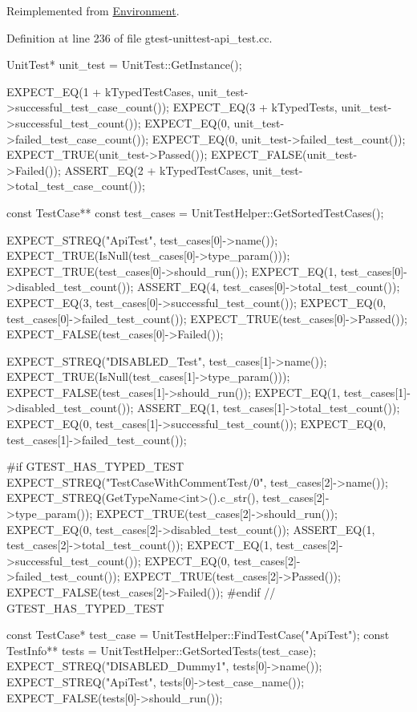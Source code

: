 \-Reimplemented from \hyperlink{classtesting_1_1Environment_a870a092058305911f3d42df45dd657e5}{\-Environment}.



\-Definition at line 236 of file gtest-\/unittest-\/api\-\_\-test.\-cc.


\begin{DoxyCode}
                          {
    UnitTest* unit_test = UnitTest::GetInstance();

    EXPECT_EQ(1 + kTypedTestCases, unit_test->successful_test_case_count());
    EXPECT_EQ(3 + kTypedTests, unit_test->successful_test_count());
    EXPECT_EQ(0, unit_test->failed_test_case_count());
    EXPECT_EQ(0, unit_test->failed_test_count());
    EXPECT_TRUE(unit_test->Passed());
    EXPECT_FALSE(unit_test->Failed());
    ASSERT_EQ(2 + kTypedTestCases, unit_test->total_test_case_count());

    const TestCase** const test_cases = UnitTestHelper::GetSortedTestCases();

    EXPECT_STREQ("ApiTest", test_cases[0]->name());
    EXPECT_TRUE(IsNull(test_cases[0]->type_param()));
    EXPECT_TRUE(test_cases[0]->should_run());
    EXPECT_EQ(1, test_cases[0]->disabled_test_count());
    ASSERT_EQ(4, test_cases[0]->total_test_count());
    EXPECT_EQ(3, test_cases[0]->successful_test_count());
    EXPECT_EQ(0, test_cases[0]->failed_test_count());
    EXPECT_TRUE(test_cases[0]->Passed());
    EXPECT_FALSE(test_cases[0]->Failed());

    EXPECT_STREQ("DISABLED_Test", test_cases[1]->name());
    EXPECT_TRUE(IsNull(test_cases[1]->type_param()));
    EXPECT_FALSE(test_cases[1]->should_run());
    EXPECT_EQ(1, test_cases[1]->disabled_test_count());
    ASSERT_EQ(1, test_cases[1]->total_test_count());
    EXPECT_EQ(0, test_cases[1]->successful_test_count());
    EXPECT_EQ(0, test_cases[1]->failed_test_count());

#if GTEST_HAS_TYPED_TEST
    EXPECT_STREQ("TestCaseWithCommentTest/0", test_cases[2]->name());
    EXPECT_STREQ(GetTypeName<int>().c_str(), test_cases[2]->type_param());
    EXPECT_TRUE(test_cases[2]->should_run());
    EXPECT_EQ(0, test_cases[2]->disabled_test_count());
    ASSERT_EQ(1, test_cases[2]->total_test_count());
    EXPECT_EQ(1, test_cases[2]->successful_test_count());
    EXPECT_EQ(0, test_cases[2]->failed_test_count());
    EXPECT_TRUE(test_cases[2]->Passed());
    EXPECT_FALSE(test_cases[2]->Failed());
#endif  // GTEST_HAS_TYPED_TEST

    const TestCase* test_case = UnitTestHelper::FindTestCase("ApiTest");
    const TestInfo** tests = UnitTestHelper::GetSortedTests(test_case);
    EXPECT_STREQ("DISABLED_Dummy1", tests[0]->name());
    EXPECT_STREQ("ApiTest", tests[0]->test_case_name());
    EXPECT_FALSE(tests[0]->should_run());

}
\end{DoxyCode}
